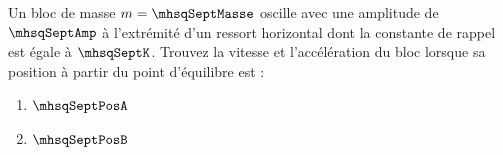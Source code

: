 Un bloc de masse $m = \mhsqSeptMasse$ oscille avec une amplitude de $\mhsqSeptAmp$ à l’extrémité d’un ressort horizontal dont la constante de rappel est égale à $\mhsqSeptK$. Trouvez la vitesse et l’accélération du bloc lorsque sa position à partir du point d’équilibre est :

\begin{enumerate}[label=\alph*)]
    \item $\mhsqSeptPosA$
    \item $\mhsqSeptPosB$
\end{enumerate}